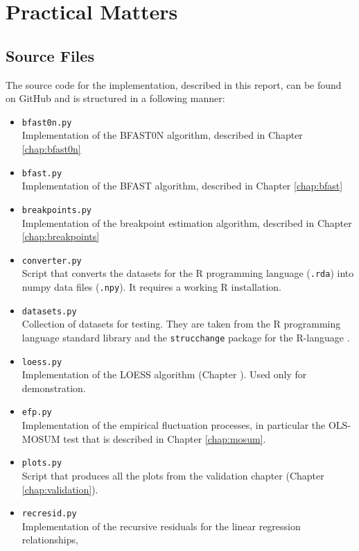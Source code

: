 \documentclass[main.tex]{subfiles}
\begin{document}
\chapter{Practical Matters}
\label{a_chap:practical}
\section*{Source Files}
\label{sec:source_files}
The source code for the implementation, described in this report, can be found
on GitHub \cite{my-github} and is structured in a following manner:
\begin{itemize}
\item \texttt{bfast0n.py}\\
  Implementation of the BFAST0N algorithm, described in Chapter \ref{chap:bfast0n}
\item \texttt{bfast.py}\\
  Implementation of the BFAST algorithm, described in Chapter \ref{chap:bfast}
\item \texttt{breakpoints.py}\\
  Implementation of the breakpoint estimation algorithm, described in Chapter \ref{chap:breakpoints}
\item \texttt{converter.py}\\
  Script that converts the datasets for the R programming language (\texttt{.rda}) into numpy
  data files (\texttt{.npy}). It requires a working R installation.
\item \texttt{datasets.py}\\
  Collection of datasets for testing. They are taken from the R programming language standard library
  \cite{r-datasets} and
  the \texttt{strucchange} package for the R-language \cite{strucchange_code}.
\item \texttt{loess.py}\\
  Implementation of the LOESS algorithm (Chapter \cite{chap:stl}). Used only for demonstration.
\item \texttt{efp.py}\\
  Implementation of the empirical fluctuation processes, in particular the OLS-MOSUM test that is
  described in Chapter \ref{chap:mosum}.
\item \texttt{plots.py}\\
  Script that produces all the plots from the validation chapter (Chapter \ref{chap:validation}).
\item \texttt{recresid.py}\\
  Implementation of the recursive residuals for the linear regression relationships,

\end{itemize}
\end{document}
